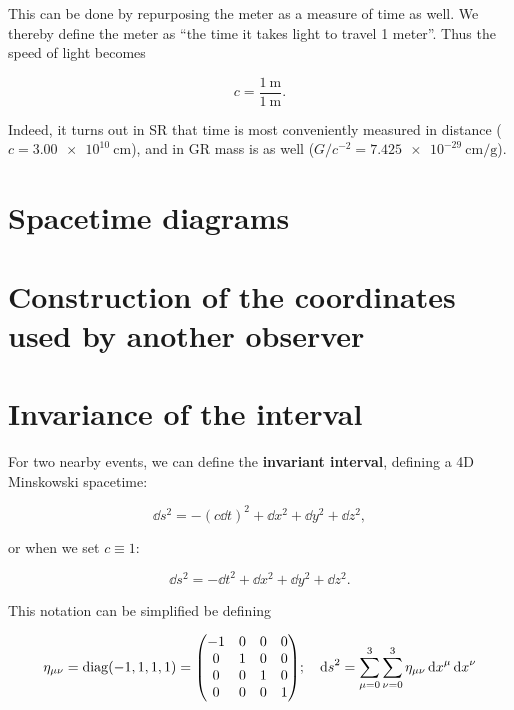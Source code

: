 \documentclass[gr-notes.tex]{subfiles}
\begin{document}
This can be done by repurposing the meter as a measure of time as well. We thereby define the meter as ``the time it takes light to travel 1 meter''. Thus the speed of light becomes

\begin{displaymath}
  c = \frac{\SI{1}{\meter}}{\SI{1}{\meter}}.
\end{displaymath}

Indeed, it turns out in SR that time is most conveniently measured in distance ($c = \SI{3.00e10}{\centi\meter}$), and in GR mass is as well ($G/c^{-2} = \SI{7.425e-29}{\centi\meter\per\gram}$).


\section{Spacetime diagrams}

\section{Construction of the coordinates used by another observer}

\section{Invariance of the interval}

For two nearby events, we can define the \textbf{invariant interval}, defining a 4D Minskowski spacetime:

\begin{displaymath}
  \dd{s}^2 = -(c \dd{t})^2 + \dd{x}^2 + \dd{y}^2 + \dd{z}^2,
\end{displaymath}

or when we set $c \equiv 1$:

\begin{displaymath}
  \dd{s}^2 = -\dd{t}^2 + \dd{x}^2 + \dd{y}^2 + \dd{z}^2.
%
  \tag{Schutz 1.1}
  \label{schutz:1.1}
\end{displaymath}

This notation can be simplified be defining

\begin{displaymath}
  \eta_{\mu\nu} =
  \diag(-1, 1, 1, 1) =
  \mqty(-1 & 0 & 0 & 0 \\
         0 & 1 & 0 & 0 \\
         0 & 0 & 1 & 0 \\
         0 & 0 & 0 & 1);
  \quad
  \dd{s}^2 = \sum_{\mu=0}^3 \sum_{\nu=0}^3 \eta_{\mu\nu} \dd{x}^\mu \dd{x}^\nu
\end{displaymath}
\end{document}
